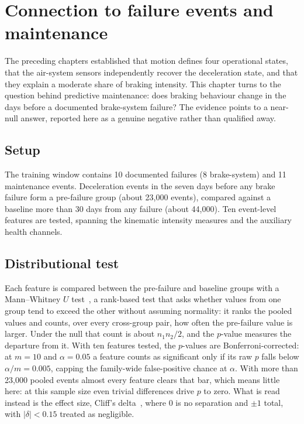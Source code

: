 \chapter{Connection to failure events and maintenance}
\label{ch:failure}

The preceding chapters established that motion defines four operational states, that the
air-system sensors independently recover the deceleration state, and that they explain a
moderate share of braking intensity. This chapter turns to the question behind predictive
maintenance: does braking behaviour change in the days before a documented brake-system failure?
The evidence points to a near-null answer, reported here as a genuine negative rather than
qualified away.

\section{Setup}

The training window contains 10 documented failures (8 brake-system) and 11 maintenance events.
Deceleration events in the seven days before any brake failure form a pre-failure group (about
23{,}000 events), compared against a baseline more than 30 days from any failure (about 44{,}000).
Ten event-level features are tested, spanning the kinematic intensity measures and the auxiliary
health channels.

\section{Distributional test}
\label{sec:prefailure-test}

Each feature is compared between the pre-failure and baseline groups with a Mann--Whitney $U$
test~\cite{MannWhitney:47}, a rank-based test that asks whether values from one group tend to exceed the other without
assuming normality: it ranks the pooled values and counts, over every cross-group pair, how often
the pre-failure value is larger. Under the null that count is about $n_1 n_2 / 2$, and the
$p$-value measures the departure from it. With ten features tested, the $p$-values are
Bonferroni-corrected: at $m=10$ and $\alpha = 0.05$ a feature counts as significant only if its
raw $p$ falls below $\alpha/m = 0.005$, capping the family-wide false-positive chance at $\alpha$.
With more than 23{,}000 pooled events almost every feature clears that bar, which means little
here: at this sample size even trivial differences drive $p$ to zero. What is read instead is the
effect size, Cliff's delta~\cite{Cliff:93}, where $0$ is no separation and $\pm 1$ total, with $|\delta| < 0.15$
treated as negligible.

